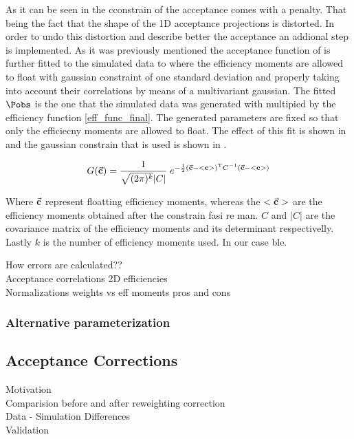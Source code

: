 As it can be seen in \figref{} the cconstrain of the acceptance comes with a penalty. That being the fact that the shape of the 1D acceptance
projections is distorted. In order to undo this distortion and describe better the acceptance an addional step is implemented. As it was
previously mentioned the acceptance function of  is further fitted to the simulated data to where the efficiency
moments are allowed to float with gaussian constraint of one standard deviation and properly taking into account their correlations by
means of a multivariant gaussian. The fitted \pdf $\Pobs$ is the one that the simulated data was generated with multipied by the 
efficiency function \eqref{eff_func_final}. The generated parameters are fixed so that only the efficiecny moments are allowed to float.     
The effect of this fit is shown in \figref{} and the gaussian constrain that is used is shown in \equref{}.

\begin{center}
\begin{equation}
  G(\vec{\bf{c}}) = \frac{1}{\sqrt{(2\pi)^k}|C|} \; e^{-\frac{1}{2}(  \vec{\bf{c}} - <{\bf{c}}>  )^{\text{T}} C^{-1} (\vec{\bf{c}} - <{\bf{c}}> ) } \nonumber
\end{equation}
\end{center}

\noindent Where $\vec{\bf c}$ represent floatting efficiency moments, whereas the $<\vec{\bf c}>$ are the efficiency moments obtained
after the constrain fasi re man. $C$ and $|C|$ are the covariance matrix of the efficiency moments and its determinant respectivelly.
Lastly $k$ is the number of efficiency moments used. In our case ble.


How errors are calculated??\\
Acceptance correlations 2D efficiencies\\
Normalizations weights vs eff moments pros and cons \\

\subsubsection{Alternative parameterization}

\subsection{Acceptance Corrections}
\label{Accceptance_Corrections}
Motivation\\
Comparision before and after reweighting correction\\
Data - Simulation Differences\\
Validation\\

